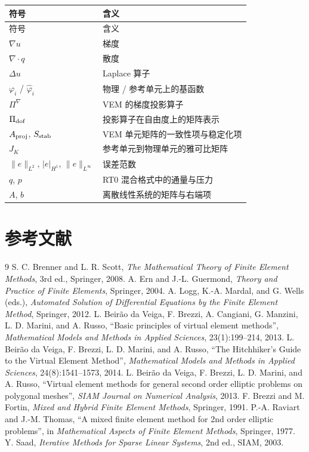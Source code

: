 \documentclass[UTF8,11pt,oneside]{ctexbook}
\theoremstyle{definition}
\theoremstyle{plain}
\begin{document}
\begin{longtable}{@{}ll@{}}
\toprule
符号 & 含义 \\
\midrule
\endfirsthead
\toprule
符号 & 含义 \\
\midrule
\endhead
$\nabla u$ & 梯度 \\
$\nabla\cdot q$ & 散度 \\
$\Delta u$ & Laplace 算子 \\
$\varphi_i$ / $\hat\varphi_i$ & 物理 / 参考单元上的基函数 \\
$\Pi^{\nabla}$ & VEM 的梯度投影算子 \\
$\Pi_{\rm dof}$ & 投影算子在自由度上的矩阵表示 \\
$A_{\rm proj}$, $S_{\rm stab}$ & VEM 单元矩阵的一致性项与稳定化项 \\
$J_K$ & 参考单元到物理单元的雅可比矩阵 \\
$\|e\|_{L^2}$, $|e|_{H^1}$, $\|e\|_{L^\infty}$ & 误差范数 \\
$q$, $p$ & RT0 混合格式中的通量与压力 \\
$A$, $b$ & 离散线性系统的矩阵与右端项 \\
\bottomrule
\end{longtable}

\chapter{参考文献}
\label{app:bib}

\begin{thebibliography}{9}
 S. C. Brenner and L. R. Scott,
  \emph{The Mathematical Theory of Finite Element Methods}, 3rd ed.,
  Springer, 2008.
 A. Ern and J.-L. Guermond,
  \emph{Theory and Practice of Finite Elements}, Springer, 2004.
 A. Logg, K.-A. Mardal, and G. Wells (eds.),
  \emph{Automated Solution of Differential Equations by the Finite Element Method},
  Springer, 2012.
 L. Beir\~ao da Veiga, F. Brezzi, A. Cangiani,
  G. Manzini, L. D. Marini, and A. Russo,
  ``Basic principles of virtual element methods'',
  \emph{Mathematical Models and Methods in Applied Sciences}, 23(1):199--214, 2013.
 L. Beir\~ao da Veiga, F. Brezzi, L. D. Marini, and A. Russo,
  ``The Hitchhiker's Guide to the Virtual Element Method'',
  \emph{Mathematical Models and Methods in Applied Sciences}, 24(8):1541--1573, 2014.
 L. Beir\~ao da Veiga, F. Brezzi, L. D. Marini, and A. Russo,
  ``Virtual element methods for general second order elliptic problems on
  polygonal meshes'', \emph{SIAM Journal on Numerical Analysis}, 2013.
 F. Brezzi and M. Fortin,
  \emph{Mixed and Hybrid Finite Element Methods}, Springer, 1991.
 P.-A. Raviart and J.-M. Thomas,
  ``A mixed finite element method for 2nd order elliptic problems'',
  in \emph{Mathematical Aspects of Finite Element Methods}, Springer, 1977.
 Y. Saad, \emph{Iterative Methods for Sparse Linear Systems},
  2nd ed., SIAM, 2003.
\end{thebibliography}
\end{document}
